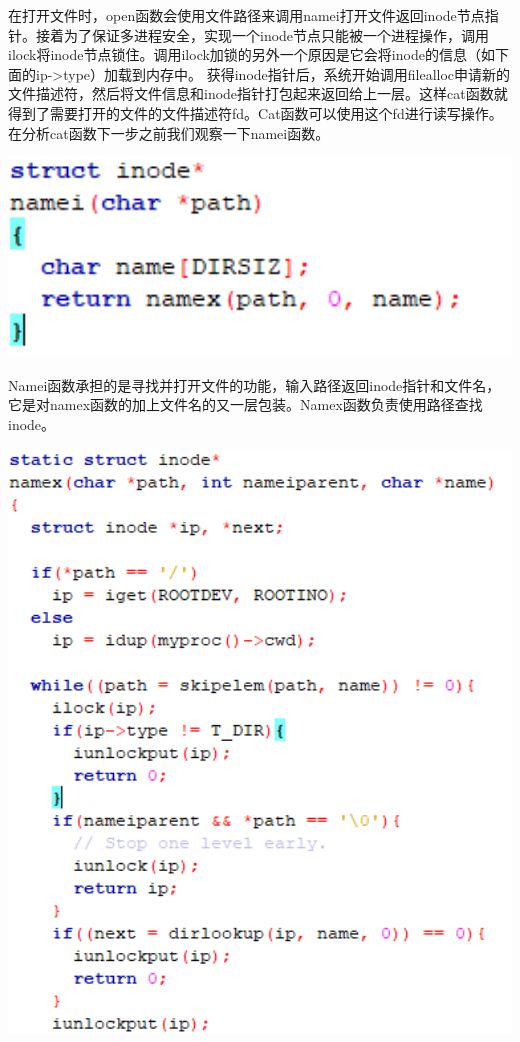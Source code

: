在打开文件时，open函数会使用文件路径来调用namei打开文件返回inode节点指针。接着为了保证多进程安全，实现一个inode节点只能被一个进程操作，调用ilock将inode节点锁住。调用ilock加锁的另外一个原因是它会将inode的信息（如下面的ip->type）加载到内存中。
获得inode指针后，系统开始调用filealloc申请新的文件描述符，然后将文件信息和inode指针打包起来返回给上一层。这样cat函数就得到了需要打开的文件的文件描述符fd。Cat函数可以使用这个fd进行读写操作。
在分析cat函数下一步之前我们观察一下namei函数。

\includegraphics[width=6in]{figures/eg_file/image172.png}


Namei函数承担的是寻找并打开文件的功能，输入路径返回inode指针和文件名，它是对namex函数的加上文件名的又一层包装。Namex函数负责使用路径查找inode。

\includegraphics[width=6in]{figures/eg_file/image173.png}

